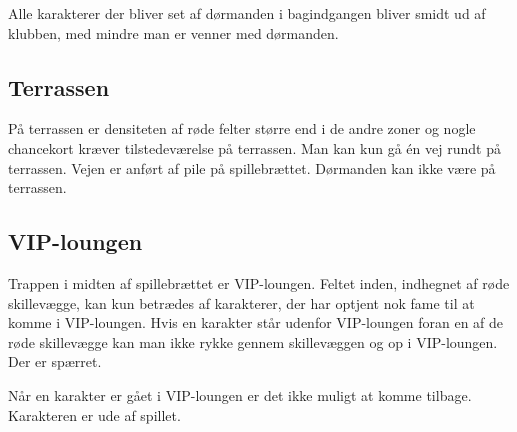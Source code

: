 Alle karakterer der bliver set af dørmanden i bagindgangen bliver smidt ud af klubben, med mindre man er venner med dørmanden.

\subsection{Terrassen}
På terrassen er densiteten af røde felter større end i de andre zoner og nogle chancekort kræver tilstedeværelse på terrassen. Man kan kun gå én vej rundt på terrassen. Vejen er anført af pile på spillebrættet. Dørmanden kan ikke være på terrassen. 


\subsection{VIP-loungen}  
Trappen i midten af spillebrættet er VIP-loungen. Feltet inden, indhegnet af røde skillevægge, kan kun betrædes af karakterer, der har optjent nok fame til at komme i VIP-loungen. Hvis en karakter står udenfor VIP-loungen foran en af de røde skillevægge kan man ikke rykke gennem skillevæggen og op i VIP-loungen. Der er spærret.

Når en karakter er gået i VIP-loungen er det ikke muligt at komme tilbage. Karakteren er ude af spillet.  